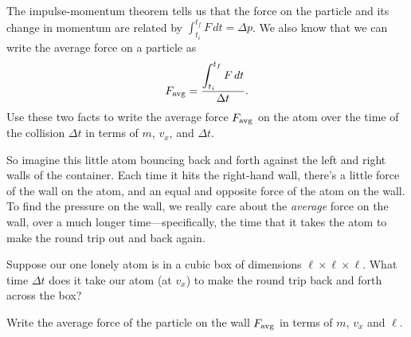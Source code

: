 \begin{enumerate}[labparts]
\item The impulse-momentum theorem tells us that the force on the particle and its change in momentum are related by $\displaystyle \int_{t_i}^{t_f} F\,dt = \Delta p$.  We also know that we can write the average force on a particle as 
\vspace{-0.2in}
$$\displaystyle F_{\rm avg} = \dfrac{\displaystyle \int_{t_i}^{t_f} F \, dt }{ \Delta t}.$$
Use these two facts to write the average force $F_{\rm avg}$ on the atom over the time of the collision $\Delta t$ in terms of $m$, $v_x$, and $\Delta t$.
\answerspace{0.3in}

So imagine this little atom bouncing back and forth against the left and right walls of the container.  Each time it hits the right-hand wall, there's a little force of the wall on the atom, and an equal and opposite force of the atom on the wall.  To find the pressure on the wall, we really care about the \textit{average} force on the wall, over a much longer time---specifically, the time that it takes the atom to make the round trip out and back again.

\begin{minipage}{0.8\textwidth}

\item Suppose our one lonely atom is in a cubic box of dimensions $\ell \times \ell \times \ell$.  What time $\Delta t$ does it take our atom (at $v_x$) to make the round trip back and forth across the box?
\answerspace{0.3in}

\item Write the average force of the particle on the wall $F_{\rm avg}$ in terms of $m$, $v_x$ and $\ell$.
\answerspace{0.4in}


\end{minipage}
\end{enumerate}
